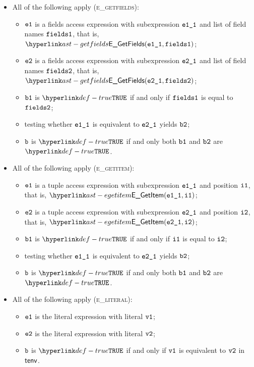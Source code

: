 \begin{itemize}
  \item All of the following apply (\textsc{e\_getfields}):
  \begin{itemize}
    \item $\texttt{e1}$ is a fields access expression with subexpression $\texttt{e1\_1}$ and list of field names $\texttt{fields1}$,
          that is, $\EGetFields(\veoneone, \vfieldsone)$;
    \item $\texttt{e2}$ is a fields access expression with subexpression $\texttt{e2\_1}$ and list of field names $\texttt{fields2}$,
          that is, $\EGetFields(\vetwoone, \vfieldstwo)$;
    \item $\texttt{b1}$ is $\True$ if and only if $\texttt{fields1}$ is equal to $\texttt{fields2}$;
    \item testing whether $\texttt{e1\_1}$ is equivalent to $\texttt{e2\_1}$ yields $\texttt{b2}$\ProseOrTypeError;
    \item $\texttt{b}$ is $\True$ if and only both $\texttt{b1}$ and $\texttt{b2}$ are $\True$.
  \end{itemize}

  \item All of the following apply (\textsc{e\_getitem}):
  \begin{itemize}
    \item $\texttt{e1}$ is a tuple access expression with subexpression $\texttt{e1\_1}$ and position $\texttt{i1}$,
          that is, $\EGetItem(\veoneone, \vione)$;
    \item $\texttt{e2}$ is a tuple access expression with subexpression $\texttt{e2\_1}$ and position $\texttt{i2}$,
          that is, $\EGetItem(\vetwoone, \vitwo)$;
    \item $\texttt{b1}$ is $\True$ if and only if $\texttt{i1}$ is equal to $\texttt{i2}$;
    \item testing whether $\texttt{e1\_1}$ is equivalent to $\texttt{e2\_1}$ yields $\texttt{b2}$\ProseOrTypeError;
    \item $\texttt{b}$ is $\True$ if and only both $\texttt{b1}$ and $\texttt{b2}$ are $\True$.
  \end{itemize}

  \item All of the following apply (\textsc{e\_literal}):
  \begin{itemize}
    \item $\texttt{e1}$ is the literal expression with literal $\texttt{v1}$;
    \item $\texttt{e2}$ is the literal expression with literal $\texttt{v2}$;
    \item $\texttt{b}$ is $\True$ if and only if $\texttt{v1}$ is equivalent to $\texttt{v2}$ in $\textsf{tenv}$.
  \end{itemize}


\end{itemize}
